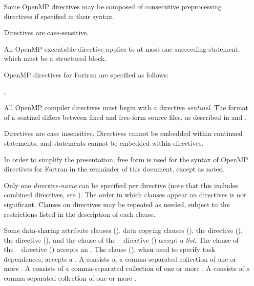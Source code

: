 Some OpenMP directives may be composed of consecutive  preprocessing 
directives if specified in their syntax.

Directives are case-sensitive. 

An OpenMP executable directive applies to at most one succeeding statement, which 
must be a structured block.
\ccppspecificend

\fortranspecificstart
OpenMP directives for Fortran are specified as follows:

\begin{boxedcode}
\plc{sentinel directive-name [clause[ [},\plc{] clause]...]}
\end{boxedcode}

All OpenMP compiler directives must begin with a directive \emph{sentinel}. The format of a 
sentinel differs between fixed and free-form source files, as described in 
 and .

Directives are case insensitive. Directives cannot be embedded within continued 
statements, and statements cannot be embedded within directives.

In order to simplify the presentation, free form is used for the syntax of OpenMP 
directives for Fortran in the remainder of this document, except as noted.
\fortranspecificend

Only one \emph{directive-name} can be specified per directive (note that this includes combined 
directives, see ).  The order in which clauses appear on directives 
is not significant. Clauses on directives may be repeated as needed, subject to the 
restrictions listed in the description of each clause.

Some data-sharing attribute clauses (), 
data copying clauses (), the 
 directive (), 
the  directive (), and the 
 clause of the ~ directive 
() accept a \emph{list}. The 
 clause of the ~ directive 
() accepts an . 
The  clause (), when used to specify task dependences,
accepts a .  A  consists of a
comma-separated collection of one or more . A
 consists of a comma-separated collection of one or more
. A  consists of a comma-separated
collection of one or more .

